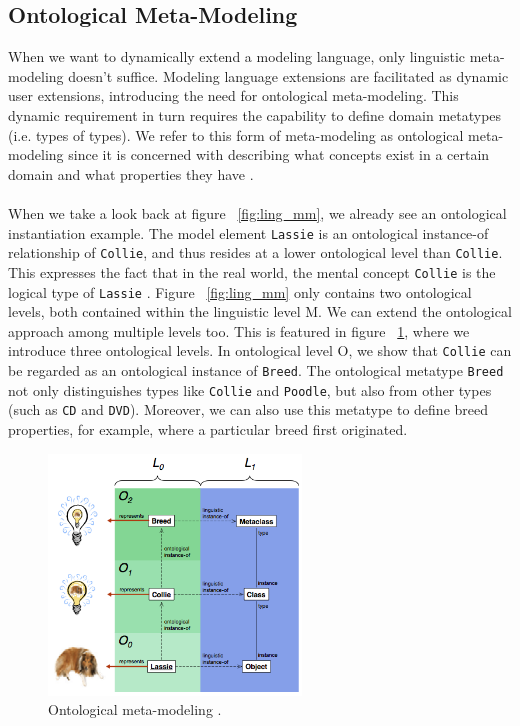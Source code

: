 \subsection{Ontological Meta-Modeling}

When we want to dynamically extend a modeling language, only linguistic meta-modeling doesn't suffice. Modeling language extensions are facilitated as dynamic user extensions, introducing the need for ontological meta-modeling. This dynamic requirement in turn requires the capability to define domain metatypes (i.e. types of types). We refer to this form of meta-modeling as ontological meta-modeling since it is concerned with describing what concepts exist in a certain domain and what properties they have \cite{MDDFound}. \\ \\
When we take a look back at figure ~\ref{fig:ling_mm}, we already see an ontological instantiation example. The model element \texttt{Lassie} is an ontological instance-of relationship of \texttt{Collie}, and thus resides at a lower ontological level than \texttt{Collie}. This expresses the fact that in the real world, the mental concept \texttt{Collie} is the logical type of \texttt{Lassie} \cite{MDDFound}. Figure ~\ref{fig:ling_mm} only contains two ontological levels, both contained within the linguistic level M. We can extend the ontological approach among multiple levels too. This is featured in figure ~\ref{fig:ont_mm}, where we introduce three ontological levels. In ontological level O, we show that \texttt{Collie} can be regarded as an ontological instance of \texttt{Breed}. The ontological metatype \texttt{Breed} not only distinguishes types like \texttt{Collie} and \texttt{Poodle}, but also from other types (such as \texttt{CD} and \texttt{DVD}). Moreover, we can also use this metatype to define breed properties, for example, where a particular breed first originated.
\begin{figure}[h!]
\centering
\includegraphics[width=0.6\textwidth]{images/chap2_ontological_mm.png}
\caption{Ontological meta-modeling \cite{MDDFound}.}
\label{fig:ont_mm}
\end{figure}
\newpage

